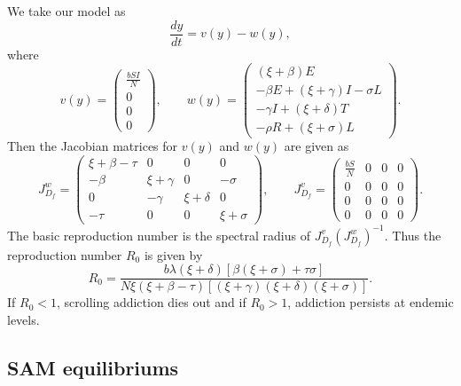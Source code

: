\documentclass[10pt]{NSP1}
\begin{document}
We take our model as
\begin{equation}
\frac{dy}{dt} = v(y) - w(y),
\tag{3.9}
\end{equation}
where
\begin{equation}
v(y) = \begin{pmatrix} \frac{b S I}{N} \\ 0 \\ 0 \\ 0 \end{pmatrix}, \qquad
w(y) = \begin{pmatrix} (\xi + \beta)E \\ -\beta E + (\xi + \gamma)I - \sigma L \\ -\gamma I + (\xi + \delta)T \\ -\rho R + (\xi + \sigma)L \end{pmatrix}.
\tag{3.10}
\end{equation}
Then the Jacobian matrices for $v(y)$ and $w(y)$ are given as
\begin{equation}
J_{D_f}^{w} = \begin{pmatrix}
\xi + \beta - \tau & 0 & 0 & 0 \\
-\beta & \xi + \gamma & 0 & -\sigma \\
0 & -\gamma & \xi + \delta & 0 \\
-\tau & 0 & 0 & \xi + \sigma
\end{pmatrix}, \qquad
J_{D_f}^{v} = \begin{pmatrix}
\frac{b S}{N} & 0 & 0 & 0 \\
0 & 0 & 0 & 0 \\
0 & 0 & 0 & 0 \\
0 & 0 & 0 & 0
\end{pmatrix}.
\tag{3.11}
\end{equation}
The basic reproduction number is the spectral radius of $J_{D_f}^{v} (J_{D_f}^{w})^{-1}$. Thus the reproduction number $R_0$ is given by
\begin{equation}
R_0 = \frac{b \lambda (\xi + \delta) \left[ \beta (\xi + \sigma) + \tau \sigma \right]}{N \xi (\xi + \beta - \tau) \left[ (\xi + \gamma)(\xi + \delta)(\xi + \sigma) \right]}.
\tag{3.12}
\end{equation}
If $R_0 < 1$, scrolling addiction dies out and if $R_0 > 1$, addiction persists at endemic levels.

\subsection{\bfseries SAM equilibriums}
\end{document}
